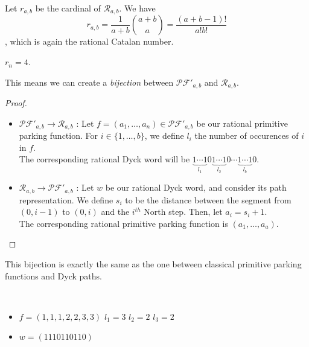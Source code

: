 \begin{theorem}
    Let $r_{a,b}$ be the cardinal of $\mathcal{R}_{a,b}$.
    We have $$r_{a,b} = \frac{1}{a+b} \binom {a+b}{a} =
    \frac{(a+b-1)!}{a!b!}$$, which is again the rational
    Catalan number.
\end{theorem}

\begin{example}[$a = 7, b = 2$]
    $r_n = 4$.
    \begin{center}
        
        
        
        
    \end{center}
\end{example}

\begin{prop}
    This means we can create a \emph{bijection} between
    $\mathcal{PF'}_{a,b}$ and $\mathcal{R}_{a,b}$.
\end{prop}

\begin{proof}
    ~\
\begin{itemize}
    \item $\mathcal{PF'}_{a,b} \to \mathcal{R}_{a,b}$ :
    Let $f = (a_1, \ldots, a_n) \in \mathcal{PF'}_{a,b}$
    be our rational primitive parking function.
    For $i \in \{1, \ldots, b\}$, we define $l_i$ the
    number of occurences of $i$ in $f$.\\
    The corresponding rational Dyck word will be
    $\underbrace{1 \cdots 1}_{l_1}0
     \underbrace{1 \cdots 1}_{l_2}0 \cdots
     \underbrace{1 \cdots 1}_{l_b}0$.
    
    \item $\mathcal{R}_{a,b} \to \mathcal{PF'}_{a,b}$ :
    Let $w$ be our rational Dyck word, and consider its path
    representation. We define $s_i$ to be the distance
    between the segment from $(0, i - 1)$ to $(0, i)$
    and the $i^{th}$ North step. Then, let $a_i = s_i + 1$.\\
    The corresponding rational primitive parking function is 
    $(a_1, \ldots, a_a)$.
\end{itemize}
\end{proof}

\begin{rem}
    This bijection is exactly the same as the one between
    classical primitive parking functions and Dyck paths.
\end{rem}

\begin{example}[$a > b : a = 7, b = 3,
    \mathcal{PF'}_{a,b} \to \mathcal{R}_{a,b}$]
    ~\
    \begin{itemize}
        \item $f = (1, 1, 1, 2, 2, 3, 3)$
            \subitem $l_1 = 3$
            \hspace{2cm} $l_2 = 2$
            \hspace{2cm} $l_3 = 2$
        \item $w = (1110110110)$
    \end{itemize}
    
\end{example}

